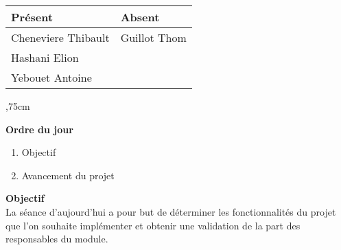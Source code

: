 \vskip 0.75cm

\begin{center}
\begin{tabular}[]{|l|l|}
     \hline 
     Présent & Absent\\
     \hline
     Cheneviere Thibault & Guillot Thom\\ 
     Hashani Elion &\\ Yebouet Antoine &\\
     \hline
\end{tabular}
\end{center}


,75cm

\noindent
\textbf{Ordre du jour}

\begin{enumerate}
    \item Objectif
    \item Avancement du projet
\end{enumerate}

\vskip 0.5cm

\noindent
\textbf{Objectif}\\
\noindent
La séance d'aujourd'hui a pour but de déterminer les fonctionnalités du projet que l'on souhaite implémenter et obtenir une validation de la part des responsables du module. \\ 

